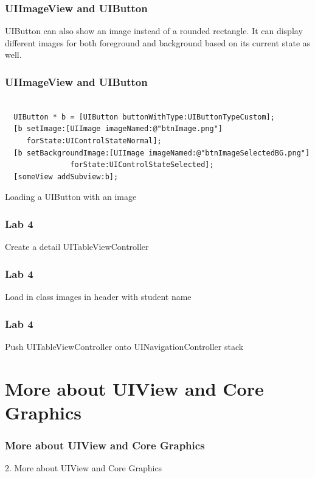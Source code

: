\documentclass[10pt]{beamer}
\begin{document}
\begin{frame}[fragile]
  \frametitle{UIImageView and UIButton}
  UIButton can also show an image instead of a rounded rectangle.  It can display different images for both foreground and background based on its current state as well.

\end{frame}

\begin{frame}[fragile]
  \frametitle{UIImageView and UIButton}
  \begin{listing}[H]
    \begin{verbatim}

  UIButton * b = [UIButton buttonWithType:UIButtonTypeCustom];
  [b setImage:[UIImage imageNamed:@"btnImage.png"]
     forState:UIControlStateNormal];
  [b setBackgroundImage:[UIImage imageNamed:@"btnImageSelectedBG.png"]
               forState:UIControlStateSelected];
  [someView addSubview:b];

  \end{verbatim}
    \caption{Loading a UIButton with an image}
    \label{listing:28}
  \end{listing}

\end{frame}

    
\begin{frame}[fragile]
  \frametitle{Lab 4}
  Create a detail UITableViewController

\end{frame}

\begin{frame}[fragile]
  \frametitle{Lab 4}
  Load in class images in header with student name

\end{frame}

\begin{frame}[fragile]
  \frametitle{Lab 4}
  Push UITableViewController onto UINavigationController stack

\end{frame}

    

   
  

  
    
\section{More about UIView and Core Graphics}
\begin{frame}[fragile]
  \frametitle{More about UIView and Core Graphics}
  2. More about UIView and Core Graphics
\end{frame}
\end{document}
